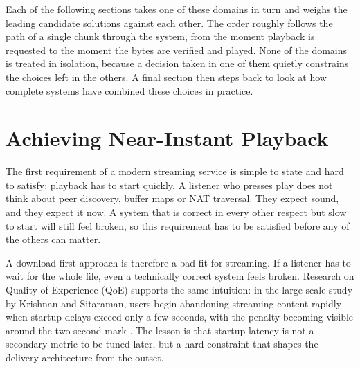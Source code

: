 \par Each of the following sections takes one of these domains in turn and weighs the leading candidate solutions against each other. The order roughly follows the path of a single chunk through the system, from the moment playback is requested to the moment the bytes are verified and played. None of the domains is treated in isolation, because a decision taken in one of them quietly constrains the choices left in the others. A final section then steps back to look at how complete systems have combined these choices in practice.

\section{Achieving Near-Instant Playback}
\indent \par The first requirement of a modern streaming service is simple to state and hard to satisfy: playback has to start quickly. A listener who presses play does not think about peer discovery, buffer maps or NAT traversal. They expect sound, and they expect it now. A system that is correct in every other respect but slow to start will still feel broken, so this requirement has to be satisfied before any of the others can matter.

\par A download-first approach is therefore a bad fit for streaming. If a listener has to wait for the whole file, even a technically correct system feels broken. Research on Quality of Experience (QoE) supports the same intuition: in the large-scale study by Krishnan and Sitaraman, users begin abandoning streaming content rapidly when startup delays exceed only a few seconds, with the penalty becoming visible around the two-second mark \cite{quality_impact}. The lesson is that startup latency is not a secondary metric to be tuned later, but a hard constraint that shapes the delivery architecture from the outset.

